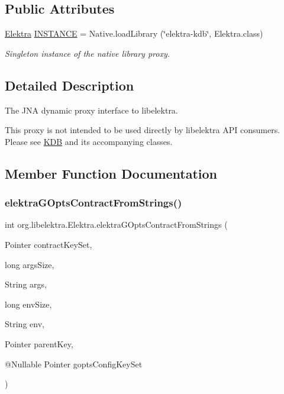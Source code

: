 \subsection*{Public Attributes}
\begin{DoxyCompactItemize}
\item 
\mbox{\label{interfaceorg_1_1libelektra_1_1Elektra_a5a69a68a26ccec272c0f992f0a94a4cc}} 
\hyperlink{interfaceorg_1_1libelektra_1_1Elektra}{Elektra} \hyperlink{interfaceorg_1_1libelektra_1_1Elektra_a5a69a68a26ccec272c0f992f0a94a4cc}{I\+N\+S\+T\+A\+N\+CE} = Native.\+load\+Library (\char`\"{}elektra-\/kdb\char`\"{}, Elektra.\+class)
\begin{DoxyCompactList}\small\item\em Singleton instance of the native library proxy. \end{DoxyCompactList}\end{DoxyCompactItemize}


\subsection{Detailed Description}
The J\+NA dynamic proxy interface to libelektra. 

This proxy is not intended to be used directly by libelektra A\+PI consumers. Please see \hyperlink{classorg_1_1libelektra_1_1KDB}{K\+DB} and its accompanying classes. 

\subsection{Member Function Documentation}
\mbox{\label{interfaceorg_1_1libelektra_1_1Elektra_aba251761ea3e25ba205df77f7729e1bf}} 
\subsubsection{\texorpdfstring{elektra\+G\+Opts\+Contract\+From\+Strings()}{elektraGOptsContractFromStrings()}}
{\footnotesize\ttfamily int org.\+libelektra.\+Elektra.\+elektra\+G\+Opts\+Contract\+From\+Strings (\begin{DoxyParamCaption}\item[{Pointer}]{contract\+Key\+Set,  }\item[{long}]{args\+Size,  }\item[{String}]{args,  }\item[{long}]{env\+Size,  }\item[{String}]{env,  }\item[{Pointer}]{parent\+Key,  }\item[{@Nullable Pointer}]{gopts\+Config\+Key\+Set }\end{DoxyParamCaption})}



